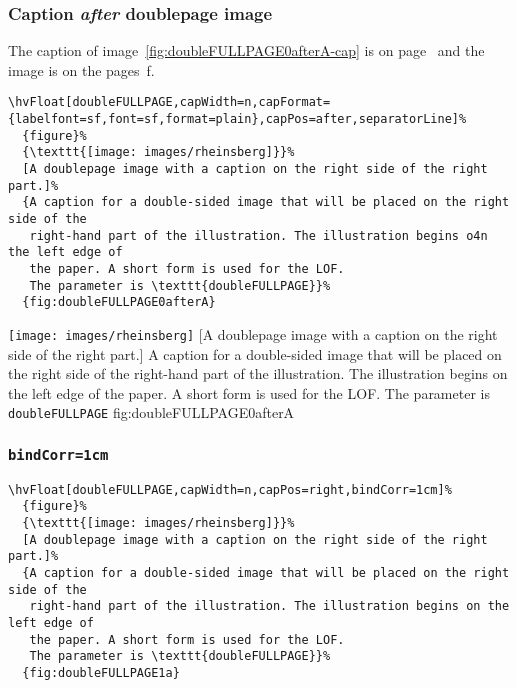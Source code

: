 \documentclass[twoside]{scrartcl}
\makeatletter
\let\hvBlindtext\Blindtext
\def\Blindtext{\par\color{black!40}\hvBlindtext\par\normalcolor}
\def\hvblindtext{\textcolor{black!40}{\blindtext@text}}
\makeatother
\begin{document}
\Blindtext

\hvblindtext

\hvblindtext

\subsubsection{Caption \emph{after} doublepage image}
The caption of image~\ref{fig:doubleFULLPAGE0afterA-cap} is on page~\pageref{fig:doubleFULLPAGE0afterA-cap} and the image
is on the pages~\pageref{fig:doubleFULLPAGE0afterA}f.

\begin{lstlisting}
\hvFloat[doubleFULLPAGE,capWidth=n,capFormat={labelfont=sf,font=sf,format=plain},capPos=after,separatorLine]%
  {figure}%
  {\texttt{[image: images/rheinsberg]}}%
  [A doublepage image with a caption on the right side of the right part.]%
  {A caption for a double-sided image that will be placed on the right side of the
   right-hand part of the illustration. The illustration begins o4n the left edge of 
   the paper. A short form is used for the LOF. 
   The parameter is \texttt{doubleFULLPAGE}}%
  {fig:doubleFULLPAGE0afterA}
\end{lstlisting}


%
  {\texttt{[image: images/rheinsberg]}}%
  [A doublepage image with a caption on the right side of the right part.]%
  {A caption for a double-sided image that will be placed on the right side of the
   right-hand part of the illustration. The illustration begins on the left edge of 
   the paper. A short form is used for the LOF. 
   The parameter is \texttt{doubleFULLPAGE}}%
  {fig:doubleFULLPAGE0afterA}

\Blindtext


\Blindtext





\subsubsection{\texttt{bindCorr=1cm}}

\begin{lstlisting}
\hvFloat[doubleFULLPAGE,capWidth=n,capPos=right,bindCorr=1cm]%
  {figure}%
  {\texttt{[image: images/rheinsberg]}}%
  [A doublepage image with a caption on the right side of the right part.]%
  {A caption for a double-sided image that will be placed on the right side of the
   right-hand part of the illustration. The illustration begins on the left edge of 
   the paper. A short form is used for the LOF. 
   The parameter is \texttt{doubleFULLPAGE}}%
  {fig:doubleFULLPAGE1a}
\end{lstlisting}
\end{document}
